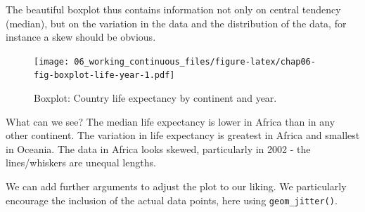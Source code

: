 \documentclass[
  12pt,
  krantz2]{krantz}
\makeatletter
\newenvironment{Shaded}{\begin{snugshade}}{\end{snugshade}}
\newcommand{\DataTypeTok}[1]{\textcolor[rgb]{0.13,0.29,0.53}{#1}}
\newcommand{\DecValTok}[1]{\textcolor[rgb]{0.00,0.00,0.81}{#1}}
\newcommand{\KeywordTok}[1]{\textcolor[rgb]{0.13,0.29,0.53}{\textbf{#1}}}
\newcommand{\NormalTok}[1]{#1}
\newcommand{\OperatorTok}[1]{\textcolor[rgb]{0.81,0.36,0.00}{\textbf{#1}}}
\newcommand{\StringTok}[1]{\textcolor[rgb]{0.31,0.60,0.02}{#1}}
\newenvironment{kframe}{%
\medskip{}
\setlength{\fboxsep}{.8em}
 \def\at@end@of@kframe{}%
 \ifinner\ifhmode%
  \def\at@end@of@kframe{\end{minipage}}%
  \begin{minipage}{\columnwidth}%
 \fi\fi%
 \def\FrameCommand##1{\hskip\@totalleftmargin \hskip-\fboxsep
 \colorbox{shadecolor}{##1}\hskip-\fboxsep
     \hskip-\linewidth \hskip-\@totalleftmargin \hskip\columnwidth}%
 \MakeFramed {\advance\hsize-\width
   \@totalleftmargin\z@ \linewidth\hsize
   \@setminipage}}%
 {\par\unskip\endMakeFramed%
 \at@end@of@kframe}
\renewenvironment{Shaded}{\begin{kframe}}{\end{kframe}}
\makeatother
\begin{document}
The beautiful boxplot thus contains information not only on central tendency (median), but on the variation in the data and the distribution of the data, for instance a skew should be obvious.

\begin{Shaded}
\end{Shaded}

\begin{figure}
\centering
\texttt{[image: 06\_working\_continuous\_files/figure-latex/chap06-fig-boxplot-life-year-1.pdf]}
\caption{\label{fig:chap06-fig-boxplot-life-year}Boxplot: Country life expectancy by continent and year.}
\end{figure}

What can we see?
The median life expectancy is lower in Africa than in any other continent.
The variation in life expectancy is greatest in Africa and smallest in Oceania.
The data in Africa looks skewed, particularly in 2002 - the lines/whiskers are unequal lengths.

\FloatBarrier

We can add further arguments to adjust the plot to our liking.
We particularly encourage the inclusion of the actual data points, here using \texttt{geom\_jitter()}.
\end{document}
